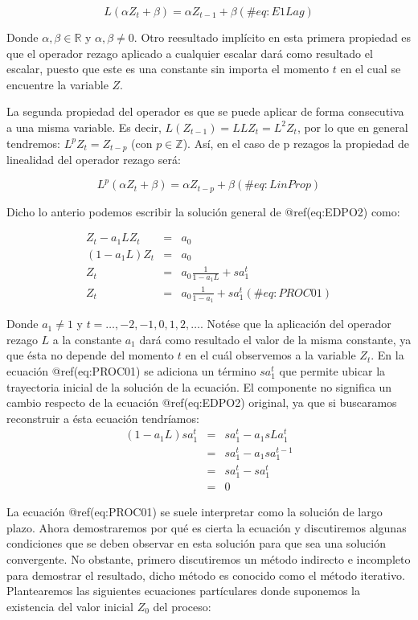 \documentclass[
  a4paper,
]{article}
\begin{document}
\[
    L(\alpha Z_{t} + \beta) = \alpha Z_{t-1} + \beta
    (\#eq:E1Lag)
\]

Donde \(\alpha, \beta \in \mathbb{R}\) y \(\alpha, \beta \neq 0\). Otro
reesultado implícito en esta primera propiedad es que el operador rezago
aplicado a cualquier escalar dará como resultado el escalar, puesto que
este es una constante sin importa el momento \(t\) en el cual se
encuentre la variable \(Z\).

La segunda propiedad del operador es que se puede aplicar de forma
consecutiva a una misma variable. Es decir,
\(L ( Z_{t-1}) = L L Z_{t} = L^2 Z_{t}\), por lo que en general
tendremos: \(L^p Z_t = Z_{t-p}\) (con \(p \in \mathbb{Z}\)). Así, en el
caso de p rezagos la propiedad de linealidad del operador rezago será:

\[
    L^p (\alpha Z_{t} + \beta) = \alpha Z_{t-p} + \beta
   (\#eq:LinProp)
\]

Dicho lo anterio podemos escribir la solución general de @ref(eq:EDPO2)
como:

\begin{eqnarray}
    Z_t - a_1 L Z_t & = & a_0 \nonumber \\
    (1 - a_1 L)Z_t & = & a_0 \nonumber \\
    Z_t & = & a_0 \frac{1}{1 - a_1 L} + s a^t_1 \nonumber \\
    Z_t & = & a_0 \frac{1}{1 - a_1} + s a^t_1
    (\#eq:PROC01)
\end{eqnarray}

Donde \(a_1 \neq 1\) y \(t = \ldots, -2, -1, 0, 1, 2, \ldots\). Notése
que la aplicación del operador rezago \(L\) a la constante \(a_1\) dará
como resultado el valor de la misma constante, ya que ésta no depende
del momento \(t\) en el cuál observemos a la variable \(Z_t\). En la
ecuación @ref(eq:PROC01) se adiciona un término \(s a^t_1\) que permite
ubicar la trayectoria inicial de la solución de la ecuación. El
componente no significa un cambio respecto de la ecuación @ref(eq:EDPO2)
original, ya que si buscaramos reconstruir a ésta ecuación tendríamos:
\begin{eqnarray}
    (1 - a_1 L) s a^t_1 & = & s a^t_1 - a_1 s L a^{t}_1 \nonumber \\
    & = & s a^t_1 - a_1 s a^{t - 1}_1 \nonumber \\
    & = & s a^t_1 - s a^t_1 \nonumber \\
    & = & 0 \nonumber
\end{eqnarray}

La ecuación @ref(eq:PROC01) se suele interpretar como la solución de
largo plazo. Ahora demostraremos por qué es cierta la ecuación y
discutiremos algunas condiciones que se deben observar en esta solución
para que sea una solución convergente. No obstante, primero discutiremos
un método indirecto e incompleto para demostrar el resultado, dicho
método es conocido como el método iterativo. Plantearemos las siguientes
ecuaciones partículares donde suponemos la existencia del valor inicial
\(Z_0\) del proceso:
\end{document}
